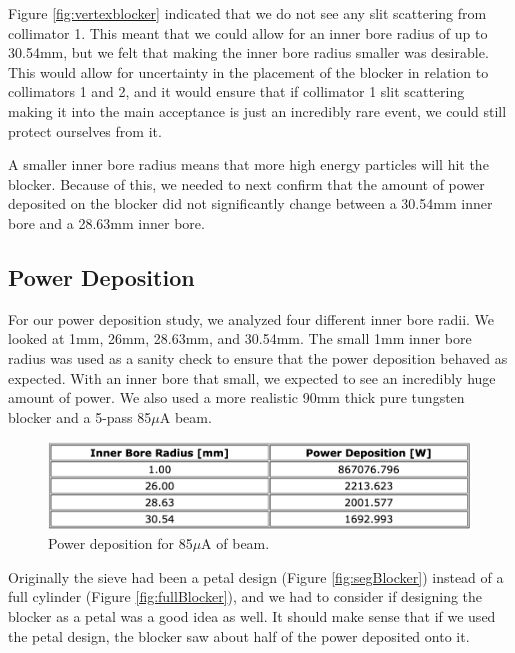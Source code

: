 Figure \ref{fig:vertexblocker} indicated that we do not see any slit scattering from collimator 1. This meant that we could allow for an inner bore radius of up to 30.54mm, but we felt that making the inner bore radius smaller was desirable. This would allow for uncertainty in the placement of the blocker in relation to collimators 1 and 2, and it would ensure that if collimator 1 slit scattering making it into the main acceptance is just an incredibly rare event, we could still protect ourselves from it.

A smaller inner bore radius means that more high energy particles will hit the blocker. Because of this, we needed to next confirm that the amount of power deposited on the blocker did not significantly change between a 30.54mm inner bore and a 28.63mm inner bore.

\subsection{Power Deposition}

For our power deposition study, we analyzed four different inner bore radii. We looked at 1mm, 26mm, 28.63mm, and 30.54mm. The small 1mm inner bore radius was used as a sanity check to ensure that the power deposition behaved as expected. With an inner bore that small, we expected to see an incredibly huge amount of power. We also used a more realistic 90mm thick pure tungsten blocker and a 5-pass 85$\mu$A beam.

\begin{figure}[H]
    \centering
    \includegraphics[width=\textwidth]{Images/PowerDepTable.png}
    \caption{Power deposition for 85$\mu$A of beam.}
    \label{fig:powerdeptable}
\end{figure}

Originally the sieve had been a petal design (Figure \ref{fig:segBlocker}) instead of a full cylinder (Figure \ref{fig:fullBlocker}), and we had to consider if designing the blocker as a petal was a good idea as well. It should make sense that if we used the petal design, the blocker saw about half of the power deposited onto it.

